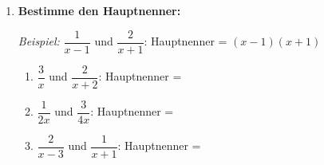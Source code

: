 \begin{enumerate}[label=\arabic*.]
    \vspace{1cm}

    \item \textbf{Bestimme den Hauptnenner:}
    \vspace{0.5cm}

    \textit{Beispiel:} $\dfrac{1}{x-1}$ und $\dfrac{2}{x+1}$: Hauptnenner = $(x-1)(x+1)$

    \begin{enumerate}[label=\alph*)]
        \item $\dfrac{3}{x}$ und $\dfrac{2}{x+2}$: Hauptnenner = \underline{\hspace{3cm}}
        \vspace{0.5cm}
        \item $\dfrac{1}{2x}$ und $\dfrac{3}{4x}$: Hauptnenner = \underline{\hspace{3cm}}
        \vspace{0.5cm}
        \item $\dfrac{2}{x-3}$ und $\dfrac{1}{x+1}$: Hauptnenner = \underline{\hspace{3cm}}
    \end{enumerate}

\end{enumerate}